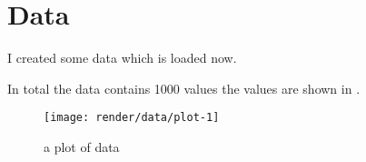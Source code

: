 \section{Data}

I created some data which is loaded now.



In total the data contains 1000 values the values are shown in
.

\begin{figure}
\texttt{[image: render/data/plot-1]} \caption[a plot of data]{a plot of data}\label{fig:plot}
\end{figure}


